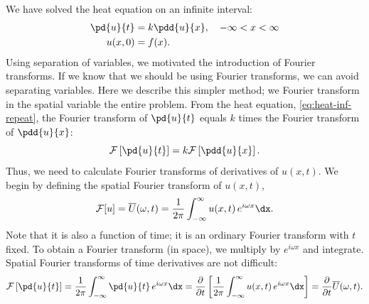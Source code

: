 We have solved the heat equation on an infinite interval:
\begin{equation}
\label{eq:heat-inf-repeat}
\begin{aligned}
\pd{u}{t} &= k\pdd{u}{x}, \quad -\infty < x < \infty \\
u(x,0) &= f(x).
\end{aligned}
\end{equation}
Using separation of variables, we motivated the introduction of Fourier transforms.  If we know that we should be using Fourier transforms, we can avoid separating variables.  Here we describe this simpler method; we Fourier transform in the spatial variable the entire problem.  From the heat equation, \eqref{eq:heat-inf-repeat}, the Fourier transform of $\pd{u}{t}$ equals $k$ times the Fourier transform of $\pdd{u}{x}$:
\begin{equation}
\label{eq:ft-heat-eq}
\mathcal{F}\left[\pd{u}{t}\right] = k\mathcal{F}\left[\pdd{u}{x}\right].
\end{equation}
Thus, we need to calculate Fourier transforms of derivatives of $u(x,t)$.  We begin by defining the spatial Fourier transform of $u(x,t)$,
\begin{equation}
\label{eq:ft-u-def}
\mathcal{F}[u] = \overline{U}(\omega,t) = \frac{1}{2\pi}\int_{-\infty}^{\infty} u(x,t)\,e^{i\omega x}\dx.
\end{equation}
Note that it is also a function of time; it is an ordinary Fourier transform with $t$ fixed.  To obtain a Fourier transform (in space), we multiply by $e^{i\omega x}$ and integrate.  Spatial Fourier transforms of time derivatives are not difficult:
\begin{equation}
\label{eq:ft-time-deriv}
\mathcal{F}\left[\pd{u}{t}\right] = \frac{1}{2\pi}\int_{-\infty}^{\infty}\pd{u}{t}\,e^{i\omega x}\dx = \frac{\partial}{\partial t}\left[\frac{1}{2\pi}\int_{-\infty}^{\infty} u(x,t)\,e^{i\omega x}\dx\right] = \frac{\partial}{\partial t}\overline{U}(\omega,t).
\end{equation}
\begin{center}
\end{center}

